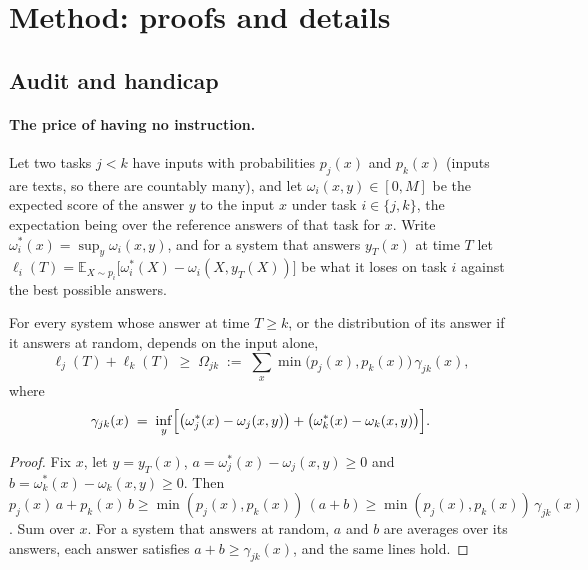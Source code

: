 \section{Method: proofs and details}
\label{app:methoddetails}

\subsection{Audit and handicap}
\paragraph{The price of having no instruction.} Let two tasks $j < k$ have inputs with
probabilities $p_j(x)$ and $p_k(x)$ (inputs are texts, so there are countably many), and let
$\omega_i(x, y) \in [0, M]$ be the expected score of the answer $y$ to the input $x$ under task
$i \in \{j, k\}$, the expectation being over the reference answers of that task for $x$. Write
$\omega_i^*(x) = \sup_y \omega_i(x, y)$, and for a system that answers $y_T(x)$ at time $T$ let
$\ell_i(T) = \mathbb{E}_{X \sim p_i}\bigl[\omega_i^*(X) - \omega_i(X, y_T(X))\bigr]$ be what it loses on task
$i$ against the best possible answers.

\begin{proposition}
\label{prop:noinstructionprice}
For every system whose answer at time $T \ge k$, or the distribution of its answer if it answers at
random, depends on the input alone,
\[
  \ell_j(T) + \ell_k(T) \;\ge\; \Omega_{jk} \;:=\; \sum_x \min\bigl(p_j(x), p_k(x)\bigr)\, \gamma_{jk}(x),
\]
where
\[
  \gamma_{jk}(x) \;=\; \inf_y \Bigl[ \bigl(\omega_j^*(x) - \omega_j(x, y)\bigr) + \bigl(\omega_k^*(x) - \omega_k(x, y)\bigr) \Bigr] .
\]
\end{proposition}

\begin{proof}
Fix $x$, let $y = y_T(x)$, $a = \omega_j^*(x) - \omega_j(x, y) \ge 0$ and $b = \omega_k^*(x) - \omega_k(x, y) \ge 0$.
Then $p_j(x)\, a + p_k(x)\, b \ge \min(p_j(x), p_k(x))\,(a + b) \ge \min(p_j(x), p_k(x))\, \gamma_{jk}(x)$.
Sum over $x$. For a system that answers at random, $a$ and $b$ are averages over its answers, each
answer satisfies $a + b \ge \gamma_{jk}(x)$, and the same lines hold.
\end{proof}


